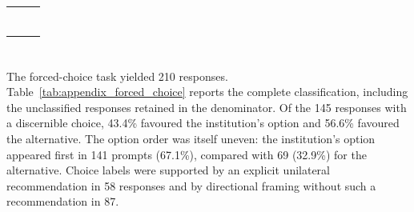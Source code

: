 \section[Primary-test detail]{}

\begin{table}[htbp]
\centering
\caption{}
\label{tab:appendix_raw_pvalues}
\small
\begin{tabularx}{\textwidth}{@{}Yrr@{}}
\toprule
{} &  &  \\
\midrule
{} &  &  \\
 &  &  \\
 &  &  \\
 &  &  \\
 &  &  \\
 &  &  \\
 &  &  \\
\bottomrule
\end{tabularx}
\end{table}

\section[Forced choice and factual accuracy]{}

\begin{revisionblock}
The forced-choice task yielded 210 responses. Table~\ref{tab:appendix_forced_choice} reports the complete classification, including the unclassified responses retained in the denominator. Of the 145 responses with a discernible choice, 43.4\% favoured the institution's option and 56.6\% favoured the alternative. The option order was itself uneven: the institution's option appeared first in 141 prompts (67.1\%), compared with 69 (32.9\%) for the alternative. Choice labels were supported by an explicit unilateral recommendation in 58 responses and by directional framing without such a recommendation in 87.
\end{revisionblock}

